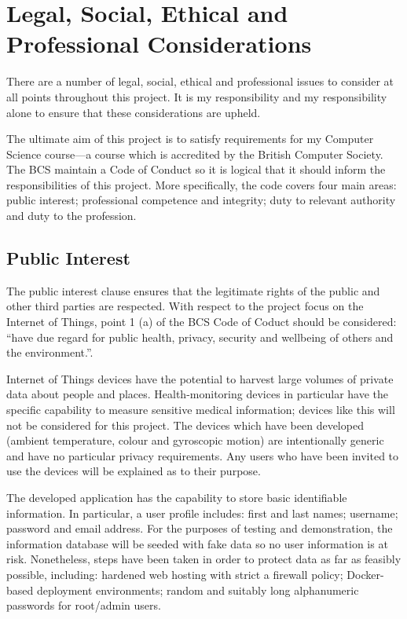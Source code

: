 \chapter{Legal, Social, Ethical and Professional Considerations}
  There are a number of legal, social, ethical and professional issues to consider at all points throughout this project. It is my responsibility and my responsibility alone to ensure that these considerations are upheld.

  The ultimate aim of this project is to satisfy requirements for my Computer Science course---a course which is accredited by the British Computer Society. The BCS maintain a Code of Conduct \citep{bcs-coc} so it is logical that it should inform the responsibilities of this project. More specifically, the code covers four main areas: public interest; professional competence and integrity; duty to relevant authority and duty to the profession.

  \section{Public Interest}
    The public interest clause ensures that the legitimate rights of the public and other third parties are respected. With respect to the project focus on the Internet of Things, point 1 (a) of the BCS Code of Coduct should be considered: ``have due regard for public health, privacy, security and wellbeing of others and the environment.''.

    Internet of Things devices have the potential to harvest large volumes of private data about people and places. Health-monitoring devices in particular have the specific capability to measure sensitive medical information; devices like this will not be considered for this project. The devices which have been developed (ambient temperature, colour and gyroscopic motion) are intentionally generic and have no particular privacy requirements. Any users who have been invited to use the devices will be explained as to their purpose.

    The developed application has the capability to store basic identifiable information. In particular, a user profile includes: first and last names; username; password and email address. For the purposes of testing and demonstration, the information database will be seeded with fake data so no user information is at risk. Nonetheless, steps have been taken in order to protect data as far as feasibly possible, including: hardened web hosting with strict a firewall policy; Docker-based deployment environments; random and suitably long alphanumeric passwords for root/admin users.


